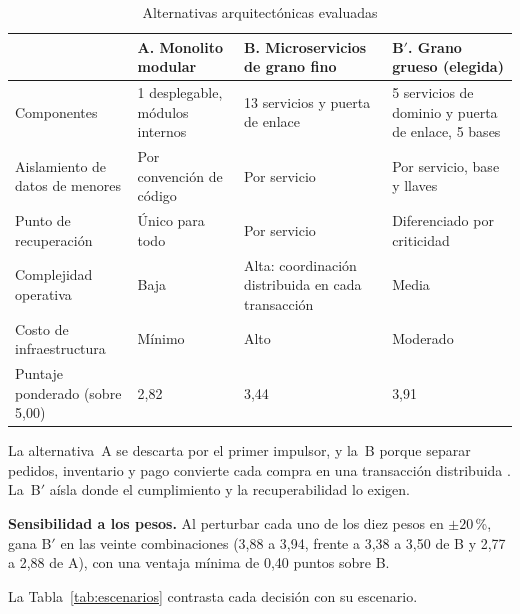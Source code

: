 \begin{table}[!htb]
\centering
\caption{Alternativas arquitectónicas evaluadas}
\label{tab:alternativas}
\small
\begin{tabular}{@{}p{2.6cm}p{3.5cm}p{3.5cm}p{4.1cm}@{}}
\toprule
& \textbf{A. Monolito modular} & \textbf{B. Microservicios de grano fino} & \textbf{B$'$. Grano grueso (elegida)} \\
\midrule
Componentes & 1 desplegable, módulos internos & 13 servicios y puerta de enlace & 5 servicios de dominio y puerta de enlace, 5 bases \\
\addlinespace
Aislamiento de datos de menores & Por convención de código & Por servicio & Por servicio, base y llaves \\
\addlinespace
Punto de recuperación & Único para todo & Por servicio & Diferenciado por criticidad \\
\addlinespace
Complejidad operativa & Baja & Alta: coordinación distribuida en cada transacción & Media \\
\addlinespace
Costo de infraestructura & Mínimo & Alto & Moderado \\
\addlinespace
Puntaje ponderado (sobre 5,00) & 2,82 & 3,44 & 3,91 \\
\bottomrule
\end{tabular}
\end{table}

La alternativa~A se descarta por el primer impulsor, y la~B porque separar pedidos, inventario y pago convierte cada compra en una transacción distribuida \citep{newman_building_2021}. La~B$'$ aísla donde el cumplimiento y la recuperabilidad lo exigen.

\textbf{Sensibilidad a los pesos.} Al perturbar cada uno de los diez pesos en $\pm 20$\,\%, gana B$'$ en las veinte combinaciones (3,88 a 3,94, frente a 3,38 a 3,50 de B y 2,77 a 2,88 de A), con una ventaja mínima de 0,40 puntos sobre B.

La Tabla~\ref{tab:escenarios} contrasta cada decisión con su escenario.

